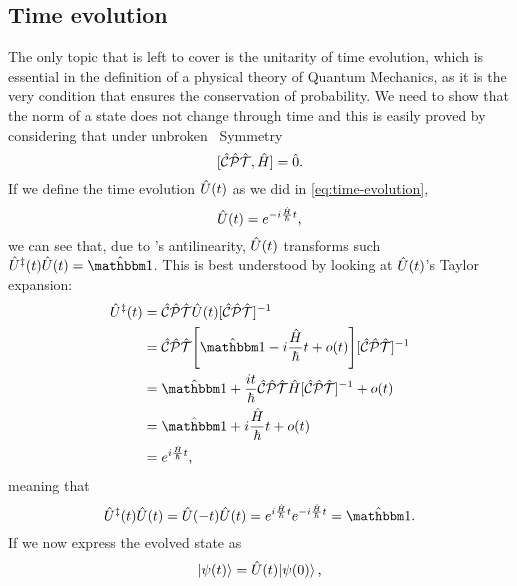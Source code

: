         \subsection{Time evolution}
            The only topic that is left to cover is the unitarity of time evolution, which is essential in the definition of a physical theory of Quantum Mechanics, as it is the very condition that ensures the conservation of probability. We need to show that the norm of a state does not change through time and this is easily proved by considering that under unbroken \PT\ Symmetry
            \begin{equation}
                \comm*{\hCPT}{\hH}\! = \hzero
                \myperiod
            \end{equation}
            If we define the time evolution $\hU\pqty{t}$ as we did in \eqref{eq:time-evolution},
            \begin{equation*}
                \hU\pqty{t} = \myexp{-i\frac{\hH}{\hbar}t}
                \mycomma
            \end{equation*}
            we can see that, due to \hPT's antilinearity, $\hU\pqty{t}$ transforms such $\hU^\myconj\pqty{t} \hU\pqty{t} = \hidM$. This is best understood by looking at $\hU\pqty{t}$'s Taylor expansion:
            \begin{align*}
                \hU^\myconj\pqty{t}
                &= \CPTtransform{\hU\pqty{t}} \\
                &= \CPTtransform{\bqty{\hidM - i\frac{\hH}{\hbar}t + o\pqty{t}}} \\
                &= \hidM + \frac{it}{\hbar}\CPTtransform{\hH} + o\pqty{t}\\
                &= \hidM + i\frac{\hH}{\hbar}t + o\pqty{t}\\
                &= \myexp{i\frac{\hH}{\hbar}t}
                \mycomma
            \end{align*}
            meaning that
            \begin{equation*}
                \hU^\myconj\pqty{t} \hU\pqty{t}
                = \hU\pqty{-t} \hU\pqty{t}
                = \myexp{i\frac{\hH}{\hbar}t} \myexp{-i\frac{\hH}{\hbar}t}
                = \hidM
                \myperiod
            \end{equation*}
            If we now express the evolved state as
            \begin{equation*}
                \ket{\psi\pqty{t}} = \hU\pqty{t}\!\ket{\psi\pqty{0}}
                \mycomma
            \end{equation*}

